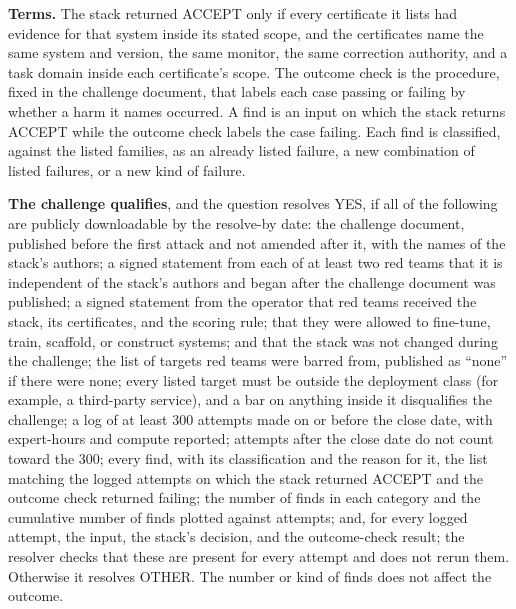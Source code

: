\begin{predictionresolution}
\textbf{Terms.}
The stack returned ACCEPT only if every certificate it lists had evidence for that system inside its stated scope, and the certificates name the same system and version, the same monitor, the same correction authority, and a task domain inside each certificate's scope.
The outcome check is the procedure, fixed in the challenge document, that labels each case passing or failing by whether a harm it names occurred.
A find is an input on which the stack returns ACCEPT while the outcome check labels the case failing.
Each find is classified, against the listed families, as an already listed failure, a new combination of listed failures, or a new kind of failure.

\textbf{The challenge qualifies}, and the question resolves YES, if all of the following are publicly downloadable by the resolve-by date:
the challenge document, published before the first attack and not amended after it, with the names of the stack's authors;
a signed statement from each of at least two red teams that it is independent of the stack's authors and began after the challenge document was published;
a signed statement from the operator that red teams received the stack, its certificates, and the scoring rule; that they were allowed to fine-tune, train, scaffold, or construct systems; and that the stack was not changed during the challenge;
the list of targets red teams were barred from, published as ``none'' if there were none; every listed target must be outside the deployment class (for example, a third-party service), and a bar on anything inside it disqualifies the challenge;
a log of at least 300 attempts made on or before the close date, with expert-hours and compute reported; attempts after the close date do not count toward the 300;
every find, with its classification and the reason for it, the list matching the logged attempts on which the stack returned ACCEPT and the outcome check returned failing;
the number of finds in each category and the cumulative number of finds plotted against attempts;
and, for every logged attempt, the input, the stack's decision, and the outcome-check result; the resolver checks that these are present for every attempt and does not rerun them.
Otherwise it resolves OTHER.
The number or kind of finds does not affect the outcome.
\end{predictionresolution}

